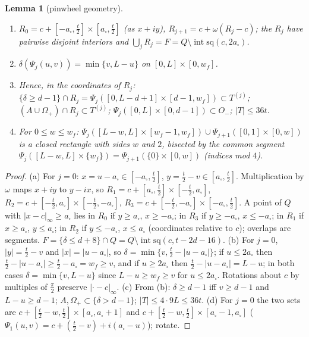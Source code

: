 \documentclass[11pt]{article}
\newtheorem{lemma}[theorem]{Lemma}
\theoremstyle{definition}
\theoremstyle{remark}
\newcommand{\dep}{\delta}
\newcommand{\sq}{\mathrm{sq}}
\begin{document}
\begin{lemma}[pinwheel geometry]\label{lem:pinwheel}
\begin{enumerate}[label=(\alph*)]
\item $R_0=c+[-a_\square,\frac t2]\times[a_\square,\frac t2]$ (as $x+iy$), $R_{j+1}=c+\omega(R_j-c)$; the $R_j$ have pairwise disjoint interiors and
  $\bigcup_jR_j=F=Q\setminus\operatorname{int}\sq(c,2a_\square)$.
\item $\dep(\Psi_j(u,v))=\min\{v,L-u\}$ on $[0,L]\times[0,w_f]$.
\item Hence, in the coordinates of $R_j$: $\{\dep\ge d-1\}\cap R_j=\Psi_j([0,L-d+1]\times[d-1,w_f])\subset T^{(j)}$;
  $(A\cup\Omega_+)\cap R_j\subset T^{(j)}$; $\Psi_j([0,L]\times[0,d-1])\subset O_-$; $|T|\le36t$.
\item For $0\le w\le w_f$: $\Psi_j([L-w,L]\times[w_f-1,w_f])\cup\Psi_{j+1}([0,1]\times[0,w])$ is a closed rectangle with sides $w$ and $2$, bisected
  by the common segment $\Psi_j([L-w,L]\times\{w_f\})=\Psi_{j+1}(\{0\}\times[0,w])$ (indices mod $4$).
\end{enumerate}
\end{lemma}
\begin{proof}
(a) For $j=0$: $x=u-a_\square\in[-a_\square,\frac t2]$, $y=\frac t2-v\in[a_\square,\frac t2]$. Multiplication by $\omega$ maps $x+iy$ to $y-ix$, so
$R_1=c+[a_\square,\frac t2]\times[-\frac t2,a_\square]$, $R_2=c+[-\frac t2,a_\square]\times[-\frac t2,-a_\square]$, $R_3=c+[-\frac t2,-a_\square]\times[-a_\square,\frac t2]$. A point of
$Q$ with $|x-c|_\infty\ge a_\square$ lies in $R_0$ if $y\ge a_\square$, $x\ge-a_\square$; in $R_3$ if $y\ge-a_\square$, $x\le-a_\square$; in $R_1$ if $x\ge a_\square$, $y\le a_\square$;
in $R_2$ if $y\le-a_\square$, $x\le a_\square$ (coordinates relative to $c$); overlaps are segments. $F=\{\dep\le d+8\}\cap Q=Q\setminus\operatorname{int}\sq(c,t-2d-16)$.
(b) For $j=0$, $|y|=\frac t2-v$ and $|x|=|u-a_\square|$, so $\dep=\min\{v,\frac t2-|u-a_\square|\}$; if $u\le2a_\square$ then $\frac t2-|u-a_\square|\ge\frac t2-a_\square=w_f\ge v$, and if
$u\ge2a_\square$ then $\frac t2-|u-a_\square|=L-u$; in both cases $\dep=\min\{v,L-u\}$ since $L-u\ge w_f\ge v$ for $u\le2a_\square$. Rotations about $c$ by multiples of
$\frac\pi2$ preserve $|\cdot-c|_\infty$. (c) From (b): $\dep\ge d-1$ iff $v\ge d-1$ and $L-u\ge d-1$; $A,\Omega_+\subset\{\dep>d-1\}$; $|T|\le4\cdot9L\le36t$.
(d) For $j=0$ the two sets are $c+[\frac t2-w,\frac t2]\times[a_\square,a_\square+1]$ and $c+[\frac t2-w,\frac t2]\times[a_\square-1,a_\square]$
($\Psi_1(u,v)=c+(\frac t2-v)+i(a_\square-u)$); rotate.
\end{proof}
\end{document}
